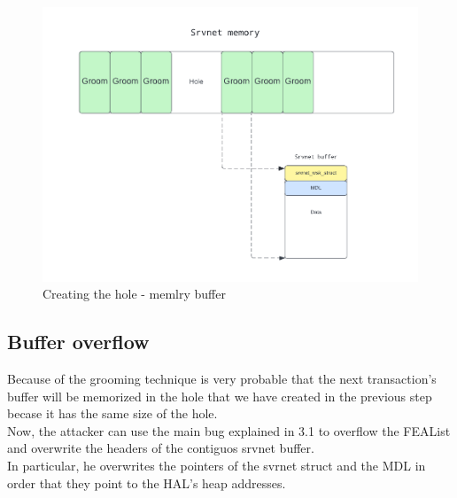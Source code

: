 \begin{figure}[ht!]
    \centering
      \includegraphics[scale=0.5]{images/exploit_4_buff.png}
      \caption{Creating the hole - memlry buffer}
\end{figure}

\clearpage
\subsection{Buffer overflow}
Because of the grooming technique is very probable that the next transaction's buffer will be memorized in 
the hole that we have created in the previous step becase it has the same size of the hole.\\
Now, the attacker can use the main bug explained in 3.1 to overflow the FEAList and overwrite the headers of the contiguos srvnet buffer.\\
In particular, he overwrites the pointers of the svrnet struct and the MDL in order that they point to the HAL's heap addresses.

